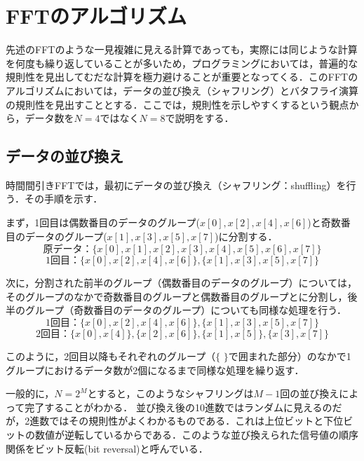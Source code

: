 \section{FFTのアルゴリズム}

先述のFFTのような一見複雑に見える計算であっても，実際には同じような計算を何度も繰り返していることが多いため，プログラミングにおいては，普遍的な規則性を見出してむだな計算を極力避けることが重要となってくる．このFFTのアルゴリズムにおいては，データの並び換え（シャフリング）とバタフライ演算の規則性を見出すこととする．ここでは，規則性を示しやすくするという観点から，データ数を$N=4$ではなく$N=8$で説明をする．

\subsection{データの並び換え}

時間間引きFFTでは，最初にデータの並び換え（シャフリング：shuffling）を行う．その手順を示す．

まず，1回目は偶数番目のデータのグループ($x[0], x[2], x[4], x[6]$)と奇数番目のデータのグループ($x[1], x[3], x[5], x[7]$)に分割する．
\begin{equation}
原データ：\{ x[0], x[1], x[2], x[3], x[4], x[5], x[6], x[7] \}
\end{equation}
\begin{equation}
1回目：\{ x[0], x[2], x[4], x[6] \} , \{ x[1], x[3], x[5], x[7] \}
\end{equation}

次に，分割された前半のグループ（偶数番目のデータのグループ）については，そのグループのなかで奇数番目のグループと偶数番目のグループとに分割し，後半のグループ（奇数番目のデータのグループ）についても同様な処理を行う．
\begin{equation}
1回目：\{ x[0], x[2], x[4], x[6] \} , \{ x[1], x[3], x[5], x[7] \}
\end{equation}
\begin{equation}
2回目：\{ x[0], x[4] \} , \{ x[2], x[6] \} , \{ x[1], x[5] \} , \{ x[3], x[7] \}
\end{equation}

このように，2回目以降もそれぞれのグループ（$\{$ $\}$で囲まれた部分）のなかで1グループにおけるデータ数が2個になるまで同様な処理を繰り返す．

一般的に，$N=2^M$とすると，このようなシャフリングは$M-1$回の並び換えによって完了することがわかる．
%
並び換え後の10進数ではランダムに見えるのだが，2進数ではその規則性がよくわかるものである．これは上位ビットと下位ビットの数値が逆転しているからである．このような並び換えられた信号値の順序関係をビット反転(bit reversal)と呼んでいる．

